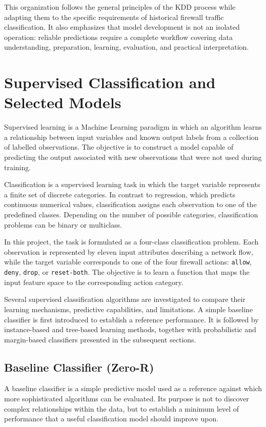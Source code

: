 This organization follows the general principles of the KDD process while adapting them to the specific requirements of historical firewall traffic classification. It also emphasizes that model development is not an isolated operation: reliable predictions require a complete workflow covering data understanding, preparation, learning, evaluation, and practical interpretation.

\section{Supervised Classification and Selected Models}

Supervised learning is a Machine Learning paradigm in which an algorithm learns a relationship between input variables and known output labels from a collection of labelled observations. The objective is to construct a model capable of predicting the output associated with new observations that were not used during training.

Classification is a supervised learning task in which the target variable represents a finite set of discrete categories. In contrast to regression, which predicts continuous numerical values, classification assigns each observation to one of the predefined classes. Depending on the number of possible categories, classification problems can be binary or multiclass.

In this project, the task is formulated as a four-class classification problem. Each observation is represented by eleven input attributes describing a network flow, while the target variable corresponds to one of the four firewall actions: \texttt{allow}, \texttt{deny}, \texttt{drop}, or \texttt{reset-both}. The objective is to learn a function that maps the input feature space to the corresponding action category.

Several supervised classification algorithms are investigated to compare their learning mechanisms, predictive capabilities, and limitations. A simple baseline classifier is first introduced to establish a reference performance. It is followed by instance-based and tree-based learning methods, together with probabilistic and margin-based classifiers presented in the subsequent sections.

\subsection{Baseline Classifier (Zero-R)}

A baseline classifier is a simple predictive model used as a reference against which more sophisticated algorithms can be evaluated. Its purpose is not to discover complex relationships within the data, but to establish a minimum level of performance that a useful classification model should improve upon.

